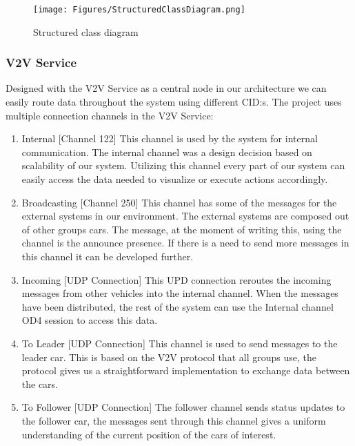 \documentclass[12pt]{article}
\begin{document}
\FloatBarrier %
\begin{figure}[ht!]
\centering
\texttt{[image: Figures/StructuredClassDiagram.png]}
\caption{Structured class diagram}
\label{fig:Structured_class_diagram}
\end{figure}
\FloatBarrier %

\subsubsection{V2V Service}
Designed with the V2V Service as a central node in our architecture we can easily route data throughout the system using different CID:s. The project uses multiple connection channels in the V2V Service:
\begin{enumerate}
\item Internal [Channel 122]
This channel is used by the system for internal communication. The internal channel was a design decision based on scalability of our system. Utilizing this channel every part of our system can easily access the data needed to visualize or execute actions accordingly.
\item Broadcasting [Channel 250]
This channel has some of the messages for the external systems in our environment. The external systems are composed out of other groups cars.  The message, at the moment of writing this,  using the channel is the announce presence. If there is a need to send more messages in this channel it can be developed further.
\item Incoming [UDP Connection]
This UPD connection reroutes the incoming messages from other vehicles into the internal channel. When the messages have been distributed, the rest of the system can use the Internal channel OD4 session to access this data. 
\item To Leader [UDP Connection]
This channel is used to send messages to the leader car. This is based on the V2V protocol that all groups use, the protocol gives us a straightforward implementation to exchange data between the cars. 
\item To Follower [UDP Connection]
The follower channel sends status updates to the follower car, the messages sent through this channel gives a uniform understanding of the current position of the cars of interest. 
\end{enumerate}
\end{document}
